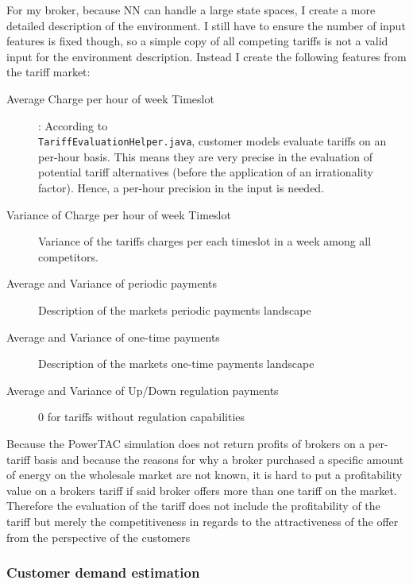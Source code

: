 {For my broker, because \ac {NN} can handle a large state spaces, I create a more detailed description of the
environment. I still have to ensure the number of input features is fixed though, so a simple copy of all competing
tariffs is not a valid input for the environment description. Instead I create the following features from the tariff
market:

\begin{description} \item[Average Charge per hour of week Timeslot]: According to \\
	\texttt{TariffEvaluationHelper.java}, customer models evaluate tariffs on an per-hour basis. This means they are
	very precise in the evaluation of potential tariff alternatives (before the application of an irrationality
	factor). Hence, a per-hour precision in the input is needed.  \item[Variance of Charge per hour of week
	Timeslot] Variance of the tariffs charges per each timeslot in a week among all competitors.  \item[Average and
	Variance of periodic payments] Description of the markets periodic payments landscape \item[Average and Variance
	of one-time payments] Description of the markets one-time payments landscape \item[Average and Variance of
	Up/Down regulation payments] 0 for tariffs without regulation capabilities \end{description}

Because the \ac {PowerTAC} simulation does not return profits of brokers on a per-tariff basis and because the reasons
for why a broker purchased a specific amount of energy on the wholesale market are not known, it is hard to put a
profitability value on a brokers tariff if said broker offers more than one tariff on the market. Therefore the
evaluation of the tariff does not include the profitability of the tariff but merely the competitiveness in regards to
the attractiveness of the offer from the perspective of the customers
%
%
\subsubsection{Customer demand estimation}%

}
